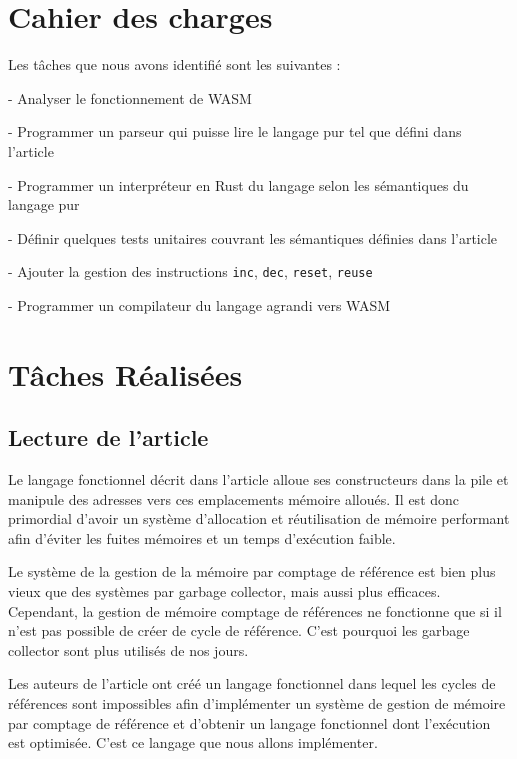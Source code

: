 \documentclass{rapportECL}
\begin{document}
\section{Cahier des charges}
Les tâches que nous avons identifié sont les suivantes :

- Analyser le fonctionnement de WASM

- Programmer un parseur qui puisse lire le langage pur tel que défini dans l'article\cite{ullrich_counting_2020}

- Programmer un interpréteur en Rust du langage selon les sémantiques du langage pur

- Définir quelques tests unitaires couvrant les sémantiques définies dans l'article

- Ajouter la gestion des instructions \verb|inc|, \verb|dec|, \verb|reset|, \verb|reuse|

- Programmer un compilateur du langage agrandi vers WASM

\section{Tâches Réalisées}

\subsection{Lecture de l'article}
Le langage fonctionnel décrit dans l'article\cite{ullrich_counting_2020} alloue ses constructeurs dans la pile et manipule des 
adresses vers ces emplacements mémoire alloués. Il est donc primordial d'avoir un système d'allocation et réutilisation de 
mémoire performant afin d'éviter les fuites mémoires et un temps d'exécution faible.

Le système de la gestion de la mémoire par comptage de référence est bien plus vieux que des systèmes par garbage collector, 
mais aussi plus efficaces\cite{ullrich_counting_2020}. Cependant, la gestion de mémoire comptage de références ne fonctionne que si 
il n'est pas possible de créer de cycle de référence. 
C'est pourquoi les garbage collector sont plus utilisés de nos jours.

Les auteurs de l'article\cite{ullrich_counting_2020} ont créé un langage fonctionnel dans lequel les cycles de références 
sont impossibles afin d'implémenter un système de gestion de mémoire par comptage de référence et d'obtenir un langage fonctionnel 
dont l'exécution est optimisée. C'est ce langage que nous allons implémenter.
\end{document}
